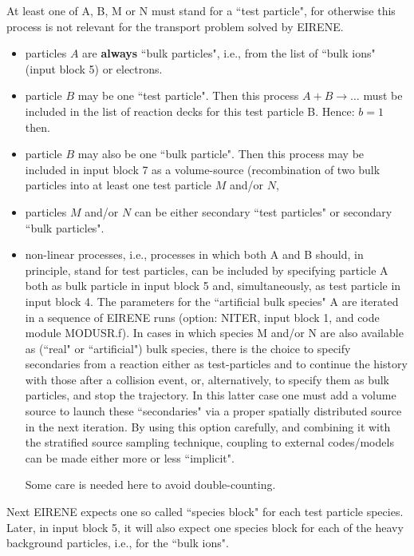 At least one of A, B, M or N must stand for a ``test particle", for otherwise
this process is not relevant for the transport problem solved by EIRENE.
\begin{itemize}
  \item particles $A$ are \textbf{always} ``bulk particles", i.e., from the list
        of ``bulk ions" (input block 5) or electrons.
  \item particle $B$ may be one ``test particle".
        Then this process $A + B \rightarrow \dots$ must be included in the list of
        reaction decks for this test particle B.
        Hence: $b = 1$ then.

  \item particle $B$ may also be one ``bulk particle".
        Then this process may be included in input block 7 as a volume-source
        (recombination of two bulk particles into at least one test particle $M$ and/or
        $N$, 

  \item particles $M$ and/or $N$ can be either secondary ``test particles" or
        secondary ``bulk particles".
  \item non-linear processes, i.e., processes in which both A and B should, in
        principle, stand for test particles, can be included by specifying particle A
        both as bulk particle in input block 5 and, simultaneously, as test particle in
        input block 4.
        The parameters for the ``artificial bulk species" A are iterated in a sequence
        of EIRENE runs (option: NITER, input block 1, and code module MODUSR.f).
        In cases in which species M and/or N are also available as (``real" or
        ``artificial")	 bulk species, there is the choice to specify secondaries from
        a reaction either as test-particles and to continue the history with those
        after a collision event, or, alternatively, to specify them as bulk particles,
        and stop the trajectory.
        In this latter case one must add a volume source to launch these ``secondaries"
        via a proper spatially distributed source in the next iteration.
        By using this option carefully, and combining it with the stratified source
        sampling technique, coupling to external codes/models can be made either more
        or less ``implicit".

        Some care is needed here to avoid double-counting.
\end{itemize}

Next EIRENE expects one so called ``species block" for each test particle
species.
Later, in input block 5, it will also expect one species block for each of the
heavy background particles, i.e., for the ``bulk ions".

